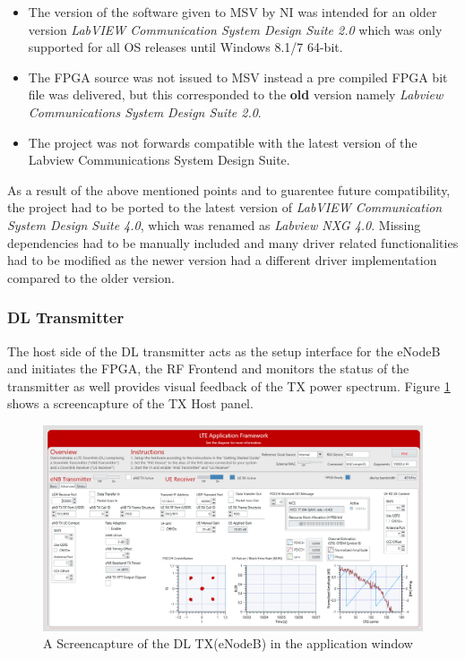 \begin{itemize}
    \item The version of the software given to MSV by NI was intended for an older version \textit{LabVIEW Communication System Design Suite 2.0} which was only supported for all OS releases until Windows 8.1/7 64-bit.

    \item The FPGA source was not issued to MSV instead a pre compiled FPGA bit file was delivered, but this corresponded to the \textbf{old} version namely \textit{Labview Communications System Design Suite 2.0}.

    \item The project was not forwards compatible with the latest version of the Labview Communications System Design Suite.
\end{itemize}

As a result of the above mentioned points and to guarentee future compatibility, the project had to be ported to the latest version of \textit{LabVIEW Communication System Design Suite 4.0}, which was renamed as \textit{Labview NXG 4.0}. Missing dependencies had to be manually included and many driver related functionalities had to be modified as the newer version had a different driver implementation compared to the older version.

\subsubsection{DL Transmitter}\label{ssec:LTEAFWTXOptions}

The host side of the DL transmitter acts as the setup interface for the eNodeB and initiates the FPGA, the RF Frontend and monitors the status of the transmitter as well provides visual feedback of the TX power spectrum. Figure \ref{fig:DLTXScreen} shows a screencapture of the TX Host panel.


\begin{figure}[H]
    \centering
    \includegraphics[width=\linewidth]{images/SISORXADVEdited.png}
    \caption{A Screencapture of the DL TX(eNodeB) in the application window}
    \label{fig:DLTXScreen}
\end{figure}

